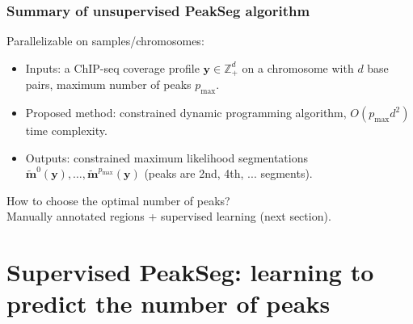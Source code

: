 \documentclass{beamer}
\newcommand{\ZZ}{\mathbb Z}
\begin{document}



\begin{frame}
  \frametitle{Summary of unsupervised PeakSeg algorithm}
  Parallelizable on samples/chromosomes:
  \begin{itemize}
  \item Inputs: a ChIP-seq coverage profile $\mathbf y\in\ZZ_+^d$ on a
    chromosome with $d$ base pairs, maximum number of peaks
    $p_{\text{max}}$.
  \item Proposed method: constrained 
    dynamic programming
    algorithm,
    $O(p_{\text{max}} d^2)$ time complexity.
  \item Outputs: constrained maximum likelihood segmentations
    $\mathbf{\tilde m}^0(\mathbf y), 
    \dots, 
    \mathbf{\tilde m}^{p_{\text{max}}}(\mathbf y)$ 
    (peaks are 2nd, 4th, ... segments).
  \end{itemize}
  How to choose the optimal number of peaks?\\
  Manually annotated regions + supervised learning (next section).
\end{frame}

\section{Supervised PeakSeg: 
  learning to predict the number of peaks}
\end{document}
